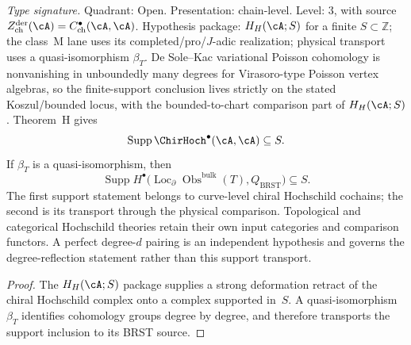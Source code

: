 \begin{proposition}
\label{prop:hc-theorem-h-scope}
\textit{Type signature.} Quadrant: Open. Presentation: chain-level.
Level: $3$, with source
$Z^{\mathrm{der}}_{\mathrm{ch}}(\cA)=C^\bullet_{\mathrm{ch}}(\cA,\cA)$.
Hypothesis package: $H_H(\cA;S)$ for a finite
$S\subset\mathbb Z$; the class~M lane uses its
completed/pro/$J$-adic realization; physical transport uses a
quasi-isomorphism $\beta_T$.  De Sole--Kac variational Poisson
cohomology is nonvanishing in unboundedly many degrees for
Virasoro-type Poisson vertex algebras, so the finite-support
conclusion lives strictly on the stated Koszul/bounded locus, with
the bounded-to-chart comparison part of $H_H(\cA;S)$.
\smallskip\noindent
Theorem~H gives
\[
\operatorname{Supp}\ChirHoch^\bullet(\cA,\cA)
\subseteq S.
\]
If $\beta_T$ is a quasi-isomorphism, then
\[
\operatorname{Supp}H^\bullet\bigl(
\operatorname{Loc}_{\partial}\operatorname{Obs}^{\mathrm{bulk}}(T),
Q_{\mathrm{BRST}}\bigr)
\subseteq S.
\]
The first support statement belongs to curve-level chiral Hochschild
cochains; the second is its transport through the physical comparison.
Topological and categorical Hochschild theories retain their own input
categories and comparison functors.
A perfect degree-$d$ pairing is an independent hypothesis and governs
the degree-reflection statement rather than this support transport.
\end{proposition}

\begin{proof}
The $H_H(\cA;S)$ package supplies a strong deformation retract of the
chiral Hochschild complex onto a complex supported in~$S$.  A
quasi-isomorphism $\beta_T$ identifies cohomology groups degree by
degree, and therefore transports the support inclusion to its BRST
source.
\end{proof}

